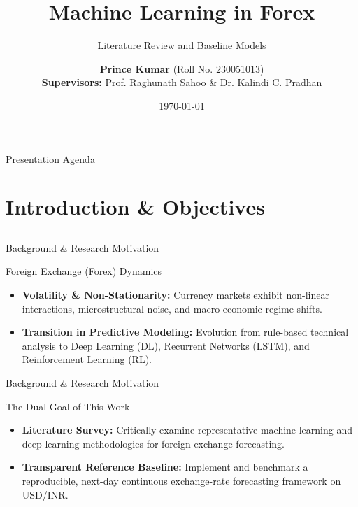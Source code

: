 \documentclass[aspectratio=169]{beamer}
\title[Machine Learning in Forex]{Machine Learning in Forex}
\subtitle{Literature Review and Baseline Models}
\author[Prince Kumar]{%
  \textbf{Prince Kumar} (Roll No. 230051013)\\[0.5em]
  \small \textbf{Supervisors:} Prof. Raghunath Sahoo \& Dr. Kalindi C. Pradhan
}
\institute[IIT Indore]{
  \textbf{Department of Physics}\\
  \textbf{Indian Institute of Technology Indore}
}
\date{\today}
\begin{document}
\begin{withoutheadline}
\begin{frame}[plain]
	\titlepage
\end{frame}
\end{withoutheadline}

\begin{frame}[label=inhalt]{Presentation Agenda}
	\tableofcontents
\end{frame}

\section{Introduction \& Objectives}
\subsection*{}

\begin{frame}{Background \& Research Motivation}
	\begin{block}{Foreign Exchange (Forex) Dynamics}
		\begin{itemize}
			\item \textbf{Volatility \& Non-Stationarity:} Currency markets exhibit non-linear interactions, microstructural noise, and macro-economic regime shifts.
			\item \textbf{Transition in Predictive Modeling:} Evolution from rule-based technical analysis to Deep Learning (DL), Recurrent Networks (LSTM), and Reinforcement Learning (RL).
		\end{itemize}
	\end{block}

\end{frame}

\begin{frame}{Background \& Research Motivation}

	\begin{block}{The Dual Goal of This Work}
		\begin{itemize}
			\item \textbf{Literature Survey:} Critically examine representative machine learning and deep learning methodologies for foreign-exchange forecasting.
			\item \textbf{Transparent Reference Baseline:} Implement and benchmark a reproducible, next-day continuous exchange-rate forecasting framework on USD/INR.
		\end{itemize}
	\end{block}
\end{frame}
\end{document}
